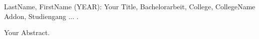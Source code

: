 \label{ch:autorenreferat}

LastName, FirstName (YEAR): Your Title, Bachelorarbeit, College, CollegeName Addon, Studiengang ... .

\vspace{1cm}

Your Abstract.